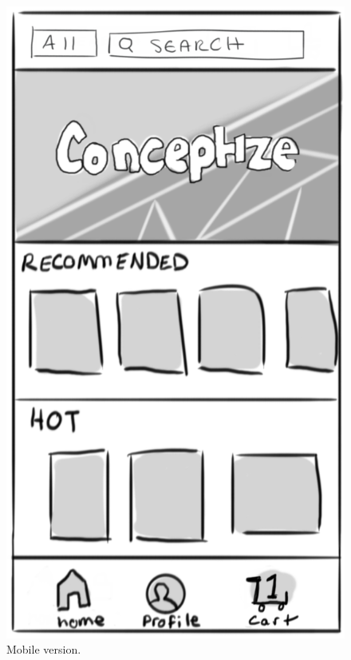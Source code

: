 \documentclass[]{article}
\begin{document}
\begin{enumerate}
		\begin{figure}
		  \includegraphics[width=\linewidth]{./pictures/homepage_mobile.png}
		  \caption{Mobile version.}
		  \label{fig:mobile6}
		\end{figure}
		

\end{enumerate}
\end{document}
